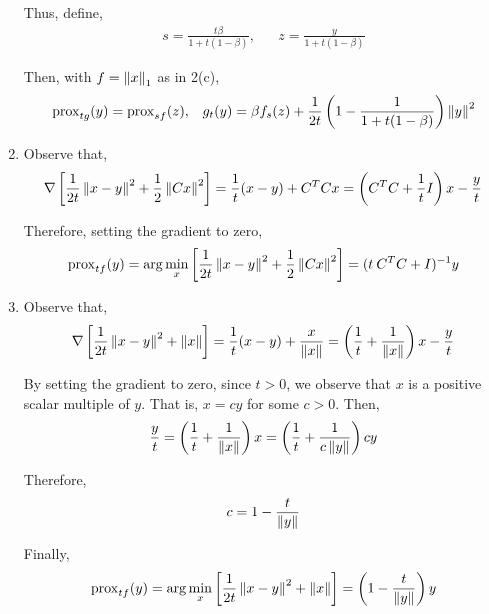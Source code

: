 \documentclass[10pt]{article}
\newcommand{\prox}{\operatorname{prox}}
\begin{document}
\begin{solution}[Solution]
\begin{enumerate}[label=(\alph*)]
        Thus, define,
        \begin{align*}
            s = \frac{t\beta}{1 + t(1-\beta)}
            ,&&
            z = \frac{y}{1+t(1-\beta)}
        \end{align*}

        Then, with \( f=\left\lVert x\right\rVert_1 \) as in 2(c),
        \begin{align*}
            \prox_{tg}(y) = \prox_{sf}(z)
            ,&&
            g_t(y) = \beta f_s(z) + \frac{1}{2t} \left( 1-\frac{1}{1+t(1-\beta)} \right) \norm{y}^2
        \end{align*}
        


    \item
        Observe that,
        \begin{align*}
            \nabla \left[ \frac{1}{2t} \left\lVert x-y\right\rVert^2 + \frac{1}{2} \left\lVert Cx\right\rVert^2 \right]
            = \frac{1}{t} (x - y) + C^TCx
            = \left(C^TC+\frac{1}{t}I\right)x - \frac{y}{t}
        \end{align*}

        Therefore, setting the gradient to zero,
        \begin{align*}
            \prox_{tf}(y) = \arg\min_x \left[ \frac{1}{2t} \norm{x-y}^2 + \frac{1}{2}\norm{Cx}^2 \right]
            = (t\:C^TC+I)^{-1}y
        \end{align*}
        
    \item
        Observe that,
        \begin{align*}
            \nabla \left[ \frac{1}{2t} \left\lVert x-y\right\rVert^2 + \left\lVert x\right\rVert \right]
            = \frac{1}{t}(x-y) + \frac{x}{\left\lVert x\right\rVert}
            = \left( \frac{1}{t} + \frac{1}{\left\lVert x\right\rVert} \right)x - \frac{y}{t}
        \end{align*}


        By setting the gradient to zero, since \( t > 0 \), we observe that \( x \) is a positive scalar multiple of \( y \). That is, \( x = cy \) for some \( c > 0 \). Then,
        \begin{align*}
            \frac{y}{t} = \left(\frac{1}{t} + \frac{1}{\left\lVert x\right\rVert} \right) x = \left( \frac{1}{t} + \frac{1}{c\left\lVert y\right\rVert} \right) c y
        \end{align*}

        Therefore,
        \begin{align*}
            c =  1 - \frac{t}{\left\lVert y\right\rVert}
        \end{align*}

        Finally,
        \begin{align*}
            \prox_{tf}(y) = \arg\min_x \left[ \frac{1}{2t} \norm{x-y}^2 + \norm{x} \right]
            = \left( 1-\frac{t}{\norm{y}} \right) y
        \end{align*}
        

       
        
\end{enumerate}

\end{solution}
\end{document}

